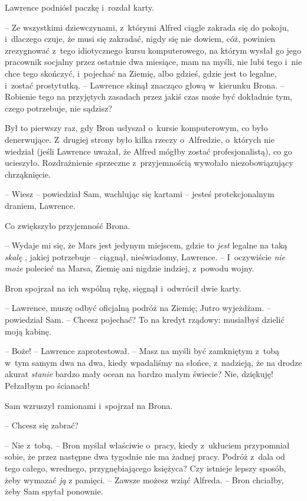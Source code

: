 \documentclass[oneside,polish,11pt,rmheadings]{mwbk}
\begin{document}
Lawrence podniósł paczkę i~rozdał karty. 

-- Ze wszystkimi dziewczynami, z~którymi Alfred ciągle zakrada się do pokoju, i~dlaczego czuje, że musi się zakradać, nigdy się nie dowiem, cóż, powinien zrezygnować z~tego idiotycznego kursu komputerowego, na którym wysłał go jego pracownik socjalny przez ostatnie dwa miesiące, mam na myśli, nie lubi tego i~nie chce tego skończyć, i~pojechać na Ziemię, albo gdzieś, gdzie jest to legalne, i~zostać prostytutką. -- Lawrence skinął znacząco głową w~kierunku Brona. -- Robienie tego na przyjętych zasadach przez jakiś czas może być dokładnie tym, czego potrzebuje, nie sądzisz? 

Był to pierwszy raz, gdy Bron usłyszał o~kursie komputerowym, co było denerwujące. Z~drugiej strony było kilka rzeczy o~Alfredzie, o~których nie wiedział (jeśli Lawrence uważał, że Alfred mógłby zostać profesjonalistą), co go ucieszyło. Rozdrażnienie sprzeczne z~przyjemnością wywołało niezobowiązujący chrząknięcie. 

-- Wiesz -- powiedział Sam, wachlując się kartami -- jesteś protekcjonalnym draniem, Lawrence. 

Co zwiększyło przyjemność Brona. 

-- Wydaje mi się, że Mars jest jedynym miejscem, gdzie to \textit{jest }legalne na taką \textit{skalę }, jakiej potrzebuje -- ciągnął, nieświadomy, Lawrence. -- I~oczywiście \textit{nie może }polecieć na Marsa, Ziemię ani nigdzie indziej, z~powodu wojny. 

Bron spojrzał na ich wspólną rękę, sięgnął i~odwrócił dwie karty. 

-- Lawrence, muszę odbyć oficjalną podróż na Ziemię; Jutro wyjeżdżam. -- powiedział Sam.  -- Chcesz pojechać? To na kredyt rządowy: musiałbyś dzielić moją kabinę. 

-- Boże! -- Lawrence zaprotestował. -- Masz na myśli być zamkniętym z~tobą w~tym samym dwa na dwa, kiedy wpadaliśmy na słońce, z~nadzieją, że na drodze akurat \textit{stanie }bardzo mały ocean na bardzo małym świecie? Nie, dziękuję! Pełzałbym po ścianach! 

Sam wzruszył ramionami i~spojrzał na Brona. 

-- Chcesz się zabrać?  

-- Nie z~tobą. -- Bron myślał właściwie o~pracy, kiedy z~ukłuciem przypomniał sobie, że przez następne dwa tygodnie nie ma żadnej pracy. Podróż z~dala od tego całego, wrednego, przygnębiającego księżyca? Czy istnieje lepszy sposób, żeby wymazać \textit{ją }z pamięci. -- Zawsze możesz wziąć Alfreda. -- Bron chciałby, żeby Sam spytał ponownie. 
\end{document}
